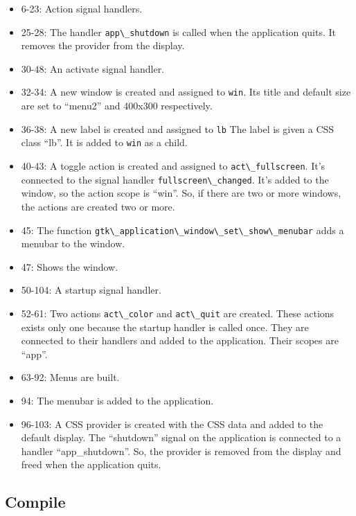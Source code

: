 \begin{itemize}
\tightlist
\item
  6-23: Action signal handlers.
\item
  25-28: The handler \passthrough{\lstinline!app\_shutdown!} is called
  when the application quits. It removes the provider from the display.
\item
  30-48: An activate signal handler.
\item
  32-34: A new window is created and assigned to
  \passthrough{\lstinline!win!}. Its title and default size are set to
  ``menu2'' and 400x300 respectively.
\item
  36-38: A new label is created and assigned to
  \passthrough{\lstinline!lb!} The label is given a CSS class ``lb''. It
  is added to \passthrough{\lstinline!win!} as a child.
\item
  40-43: A toggle action is created and assigned to
  \passthrough{\lstinline!act\_fullscreen!}. It's connected to the
  signal handler \passthrough{\lstinline!fullscreen\_changed!}. It's
  added to the window, so the action scope is ``win''. So, if there are
  two or more windows, the actions are created two or more.
\item
  45: The function
  \passthrough{\lstinline!gtk\_application\_window\_set\_show\_menubar!}
  adds a menubar to the window.
\item
  47: Shows the window.
\item
  50-104: A startup signal handler.
\item
  52-61: Two actions \passthrough{\lstinline!act\_color!} and
  \passthrough{\lstinline!act\_quit!} are created. These actions exists
  only one because the startup handler is called once. They are
  connected to their handlers and added to the application. Their scopes
  are ``app''.
\item
  63-92: Menus are built.
\item
  94: The menubar is added to the application.
\item
  96-103: A CSS provider is created with the CSS data and added to the
  default display. The ``shutdown'' signal on the application is
  connected to a handler ``app\_shutdown''. So, the provider is removed
  from the display and freed when the application quits.
\end{itemize}

\subsection{Compile}\label{compile}

